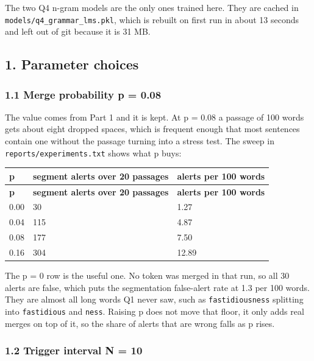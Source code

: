 \documentclass[11pt,a4paper]{article}
\begin{document}
The two Q4 n-gram models are the only ones trained here. They are cached in \texttt{models/\allowbreak{}q4\_\allowbreak{}grammar\_\allowbreak{}lms.\allowbreak{}pkl}, which is rebuilt on first run in about 13 seconds and left out of git because it is 31 MB.

\subsection*{1. Parameter choices}

\subsubsection*{1.1 Merge probability p = 0.08}

The value comes from Part 1 and it is kept. At p = 0.08 a passage of 100 words gets about eight dropped spaces, which is frequent enough that most sentences contain one without the passage turning into a stress test. The sweep in \texttt{reports/\allowbreak{}experiments.\allowbreak{}txt} shows what p buys:

{\small
\setlength{\tabcolsep}{4pt}
\begin{longtable}{lll}
\toprule
\textbf{p} & \textbf{segment alerts over 20 passages} & \textbf{alerts per 100 words} \\
\midrule
\endfirsthead
\toprule
\textbf{p} & \textbf{segment alerts over 20 passages} & \textbf{alerts per 100 words} \\
\midrule
\endhead
0.00 & 30 & 1.27 \\
0.04 & 115 & 4.87 \\
0.08 & 177 & 7.50 \\
0.16 & 304 & 12.89 \\
\bottomrule
\end{longtable}}

The p = 0 row is the useful one. No token was merged in that run, so all 30 alerts are false, which puts the segmentation false-alert rate at 1.3 per 100 words. They are almost all long words Q1 never saw, such as \texttt{fastidiousness} splitting into \texttt{fastidious} and \texttt{ness}. Raising p does not move that floor, it only adds real merges on top of it, so the share of alerts that are wrong falls as p rises.

\subsubsection*{1.2 Trigger interval N = 10}
\end{document}

